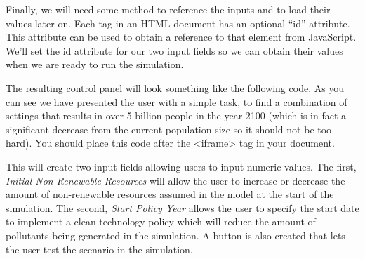 \documentclass[]{memoir}
\newenvironment{Shaded}{}{}
\newcommand{\KeywordTok}[1]{\textcolor[rgb]{0.00,0.44,0.13}{\textbf{{#1}}}}
\newcommand{\StringTok}[1]{\textcolor[rgb]{0.25,0.44,0.63}{{#1}}}
\newcommand{\OtherTok}[1]{\textcolor[rgb]{0.00,0.44,0.13}{{#1}}}
\newcommand{\NormalTok}[1]{{#1}}
\begin{document}
Finally, we will need some method to reference the inputs and to load
their values later on. Each tag in an HTML document has an optional
``id'' attribute. This attribute can be used to obtain a reference to
that element from JavaScript. We'll set the id attribute for our two
input fields so we can obtain their values when we are ready to run the
simulation.

The resulting control panel will look something like the following code.
As you can see we have presented the user with a simple task, to find a
combination of settings that results in over 5 billion people in the
year 2100 (which is in fact a significant decrease from the current
population size so it should not be too hard). You should place this
code after the \textless{}iframe\textgreater{} tag in your document.

\begin{Shaded}
\end{Shaded}

This will create two input fields allowing users to input numeric
values. The first, \emph{Initial Non-Renewable Resources} will allow the
user to increase or decrease the amount of non-renewable resources
assumed in the model at the start of the simulation. The second,
\emph{Start Policy Year} allows the user to specify the start date to
implement a clean technology policy which will reduce the amount of
pollutants being generated in the simulation. A button is also created
that lets the user test the scenario in the simulation.
\end{document}
